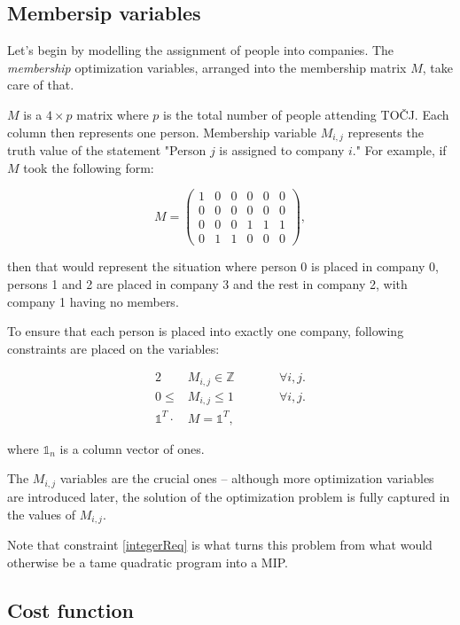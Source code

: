 \documentclass[11pt]{article}
\begin{document}
\subsection{Membersip variables}

Let's begin by modelling the assignment of people into companies.  The \emph{membership} optimization variables, arranged 
into the membership matrix $M$, take care of that.

$M$ is a $4\times{}p$ matrix where $p$ is the total number of people attending TOČJ.  Each column then represents one person.  Membership variable $M_{i,j}$
represents the truth value of the statement "Person $j$ is assigned to company $i$."  For example, if $M$ took the following form:

\[
M = \begin{pmatrix}
1 & 0 & 0 & 0 & 0 & 0 \\
0 & 0 & 0 & 0 & 0 & 0 \\
0 & 0 & 0 & 1 & 1 & 1 \\
0 & 1 & 1 & 0 & 0 & 0
\end{pmatrix},
\]

\noindent then that would represent the situation where person 0 is placed in company 0, persons 1 and 2 are placed in company 3 and the rest in company 2, with
company 1 having no members.

To ensure that each person is placed into exactly one company, following constraints are placed on the variables:

\begin{alignat}{2}
    &M_{i,j} \in \mathbb{Z} \quad \quad &&\forall i, j. \label{integerReq} \\
    0 \leq &M_{i,j} \leq 1 &&\forall i, j. \\
    \mathbb{1}^{T} \cdot &M = \mathbb{1}^{T},
\end{alignat}

where $\mathbb{1}_n$ is a column vector of ones.

The $M_{i,j}$ variables are the crucial ones -- although more optimization variables are introduced later, the solution of the optimization problem is 
fully captured in the values of $M_{i,j}$.  

Note that constraint \ref{integerReq} is what turns this problem from what would otherwise be a tame quadratic program into a MIP.

\subsection{Cost function}
\end{document}
